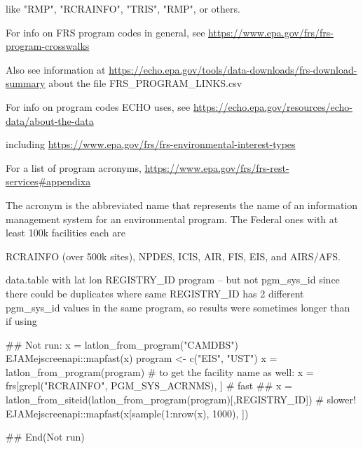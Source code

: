 \documentclass[a4paper]{book}
\begin{document}
%
\begin{Arguments}
\begin{ldescription}
\item[\code{program}] like "RMP", "RCRAINFO", "TRIS", "RMP", or others.
\end{ldescription}
\end{Arguments}
%
\begin{Details}\relax
For info on FRS program codes in general, see \url{https://www.epa.gov/frs/frs-program-crosswalks}

Also see information at \url{https://echo.epa.gov/tools/data-downloads/frs-download-summary}
about the file FRS\_PROGRAM\_LINKS.csv

For info on program codes ECHO uses, see \url{https://echo.epa.gov/resources/echo-data/about-the-data}

including \url{https://www.epa.gov/frs/frs-environmental-interest-types}

For a list of program acronyms, \url{https://www.epa.gov/frs/frs-rest-services\#appendixa}

The acronym is the abbreviated name that represents the name of an
information management system for an environmental program.
The Federal ones with at least 100k facilities each are

RCRAINFO (over 500k sites), NPDES, ICIS, AIR, FIS, EIS, and AIRS/AFS.
\end{Details}
%
\begin{Value}
data.table with lat  lon  REGISTRY\_ID  program -- but not pgm\_sys\_id
since there could be duplicates where same REGISTRY\_ID has 2 different pgm\_sys\_id values
in the same program, so results were sometimes longer than if using 
\end{Value}
%
\begin{Examples}
\begin{ExampleCode}
## Not run: 
 x = latlon_from_program("CAMDBS")
 EJAMejscreenapi::mapfast(x)
 program <- c("EIS", "UST")
 x = latlon_from_program(program)
 # to get the facility name as well:
 x = frs[grepl("RCRAINFO", PGM_SYS_ACRNMS), ] # fast
 ## x = latlon_from_siteid(latlon_from_program(program)[,REGISTRY_ID])  # slower!
 EJAMejscreenapi::mapfast(x[sample(1:nrow(x), 1000), ])

## End(Not run)
 
\end{ExampleCode}
\end{Examples}
\end{document}
